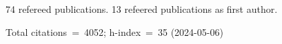 74 refereed publications. 13 refeered publications as first author.

Total citations~=~4052; h-index~=~35 (2024-05-06)
